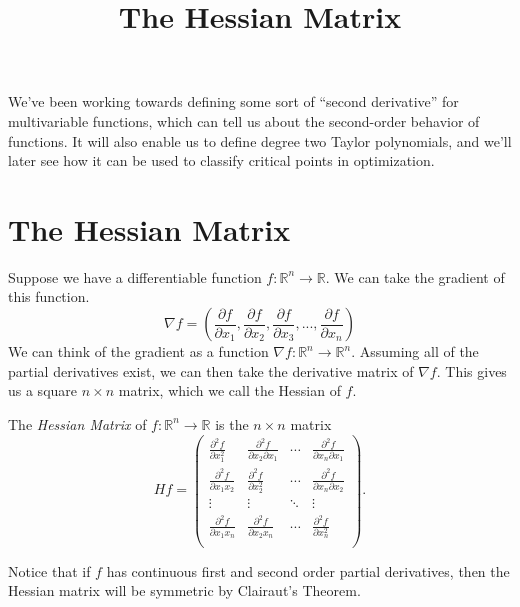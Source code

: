 \documentclass{ximera}
\title{The Hessian Matrix}
\begin{document}
\begin{abstract}
\end{abstract}
\maketitle

We've been working towards defining some sort of ``second derivative'' for multivariable functions, which can tell us about the second-order behavior of functions. It will also enable us to define degree two Taylor polynomials, and we'll later see how it can be used to classify critical points in optimization. 

\section*{The Hessian Matrix}

Suppose we have a differentiable function $f:\mathbb{R}^n\rightarrow\mathbb{R}$. We can take the gradient of this function.
\[
\nabla f = \left(\frac{\partial f}{\partial x_1}, \frac{\partial f}{\partial x_2}, \frac{\partial f}{\partial x_3},..., \frac{\partial f}{\partial x_n} \right)
\]
We can think of the gradient as a function $\nabla f: \mathbb{R}^n\rightarrow\mathbb{R}^n$. Assuming all of the partial derivatives exist, we can then take the derivative matrix of $\nabla f$. This gives us a square $n\times n$ matrix, which we call the Hessian of $f$.

\begin{definition}
The \emph{Hessian Matrix} of $f:\mathbb{R}^n\rightarrow \mathbb{R}$ is the $n\times n$ matrix
\[
Hf = \begin{pmatrix}
\frac{\partial ^2 f}{\partial x_1^2} & \frac{\partial ^2 f}{\partial x_2\partial x_1} & \cdots & \frac{\partial ^2 f}{\partial x_n\partial x_1}\\
\frac{\partial ^2 f}{\partial x_1x_2} & \frac{\partial ^2 f}{\partial x_2^2} & \cdots & \frac{\partial ^2 f}{\partial x_n\partial x_2}\\
\vdots & \vdots &\ddots & \vdots\\
\frac{\partial ^2 f}{\partial x_1x_n} & \frac{\partial ^2 f}{\partial x_2x_n} & \cdots & \frac{\partial ^2 f}{\partial x_n^2}\\
\end{pmatrix}.
\]
\end{definition}

Notice that if $f$ has continuous first and second order partial derivatives, then the Hessian matrix will be symmetric by Clairaut's Theorem.
\end{document}
